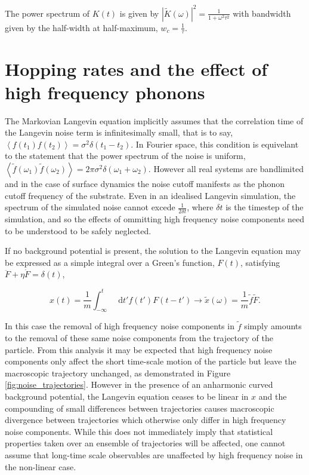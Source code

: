 \documentclass{article}
\newcommand*{\diff}{\mathop{}\!\mathrm{d}}
\begin{document}
The power spectrum of $K(t)$ is given by $\left|\tilde{K}(\omega)\right|^2 = \frac{1}{1+\omega^2\tau^2}$ with bandwidth given by the half-width at half-maximum, $w_c=\frac{1}{\tau}$.

\section{Hopping rates and the effect of high frequency phonons}

The Markovian Langevin equation implicitly assumes that the correlation time of the Langevin noise term is infinitesimally small, that is to say, $\left< f(t_1) f(t_2) \right> = \sigma^2 \delta (t_1 - t_2)$. In Fourier space, this condition is equivelant to the statement that the power spectrum of the noise is uniform, $\left< \tilde{f}(\omega_1) \tilde{f}(\omega_2) \right> = 2 \pi \sigma^2 \delta(\omega_1 + \omega_2)$. However all real systems are bandlimited and in the case of surface dynamics the noise cutoff manifests as the phonon cutoff frequency of the substrate. Even in an idealised Langevin simulation, the spectrum of the simulated noise cannot excede $\frac{1}{2\delta{t}}$, where $\delta{t}$ is the timestep of the simulation, and so the effects of ommitting high frequency noise components need to be understood to be safely neglected. 

If no background potential is present, the solution to the Langevin equation may be expressed as a simple integral over a Green's function, $F(t)$, satisfying $\ddot{F} + \eta \dot{F} = \delta(t)$,

$$
x(t) = \frac{1}{m} \int_{-\infty}^t \diff{t'} f(t') F(t-t') \longrightarrow \tilde{x}(\omega) = \frac{1}{m} \tilde{f} \tilde{F}.
$$ 

In this case the removal of high frequency noise components in $\tilde{f}$ simply amounts to the removal of these same noise components from the trajectory of the particle. From this analysis it may be expected that high frequency noise components only affect the short time-scale motion of the particle but leave the macroscopic trajectory unchanged, as demonstrated in Figure \ref{fig:noise_trajectories}. However in the presence of an anharmonic curved background potential, the Langevin equation ceases to be linear in $x$ and the compounding of small differences between trajectories causes macroscopic divergence between trajectories which otherwise only differ in high frequency noise components. While this does not immediately imply that statistical properties taken over an ensemble of trajectories will be affected, one cannot assume that long-time scale observables are unaffected by high frequency noise in the non-linear case.
\end{document}

